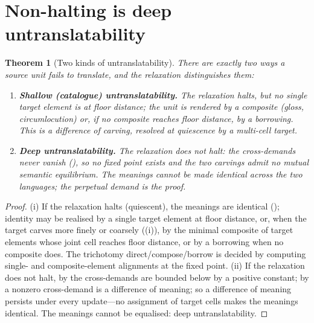 \documentclass[11pt,a4paper]{article}
\theoremstyle{thmstyle}
\newtheorem{theorem}{Theorem}[section]
\theoremstyle{definition}
\theoremstyle{remark}
\begin{document}
\section{Non-halting is deep untranslatability}
\label{sec:untranslatable}

\begin{theorem}[Two kinds of untranslatability]
\label{thm:two-kinds}
There are exactly two ways a source unit fails to translate, and the
relaxation distinguishes them:
\begin{enumerate}[label=\textup{(\roman*)},leftmargin=2.2em]
\item \textbf{Shallow (catalogue) untranslatability.} The relaxation
\emph{halts}, but no single target element is at floor distance; the unit is
rendered by a composite (gloss, circumlocution) or, if no composite reaches
floor distance, by a borrowing. This is a difference of \emph{carving},
resolved at quiescence by a multi-cell target.
\item \textbf{Deep untranslatability.} The relaxation \emph{does not halt}:
the cross-demands never vanish (), so no fixed point
exists and the two carvings admit no mutual semantic equilibrium. The
meanings \emph{cannot be made identical} across the two languages; the
perpetual demand is the proof.
\end{enumerate}
\end{theorem}

\begin{proof}
\textup{(i)} If the relaxation halts (quiescent), the meanings are identical
(); identity may be realised by a single target
element at floor distance, or, when the target carves more finely or coarsely
((i)), by the minimal composite of target elements whose
joint cell reaches floor distance, or by a borrowing when no composite does.
The trichotomy direct/compose/borrow is decided by computing single- and
composite-element alignments at the fixed point. \textup{(ii)} If the
relaxation does not halt, by  the cross-demands are
bounded below by a positive constant; by  a
nonzero cross-demand is a difference of meaning; so a difference of meaning
persists under every update---no assignment of target cells makes the meanings
identical. The meanings cannot be equalised: deep untranslatability.
\end{proof}
\end{document}
